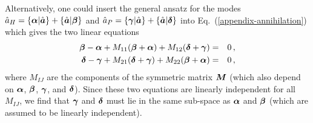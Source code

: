 \documentclass[aps,prd,showpacs,amssymb,nofootinbib,twocolumn]{revtex4}
\newcommand{\scalar}[2]{\left\{#1|#2\right\}}
\newcommand{\nn}{\nonumber\\}
\newcommand{\f}[1]{\mbox{\boldmath$#1$}}
\newcommand{\bea}{\begin{eqnarray}}
\newcommand{\ea}{\end{eqnarray}}
\begin{document}
Alternatively, one could insert the general ansatz for the modes 
$\hat a_H
=
\scalar{\f{\alpha}}{\hat{\f{a}}}+\scalar{\hat{\f{a}}}{\f{\beta}}$
and 
$\hat a_P
=
\scalar{\f{\gamma}}{\hat{\f{a}}}+\scalar{\hat{\f{a}}}{\f{\delta}}$
into Eq.~(\ref{appendix-annihilation}) which gives the two linear equations
%
\bea
\f{\beta}-\f{\alpha}+M_{11}(\f{\beta}+\f{\alpha})+M_{12}(\f{\delta}+\f{\gamma}) &=& 0 
\,,
\nn
\f{\delta}-\f{\gamma}+M_{21}(\f{\delta}+\f{\gamma})+M_{22}(\f{\beta}+\f{\alpha}) &=& 0 
\,,
\ea
%
where $M_{IJ}$ are the components of the symmetric matrix $\f{M}$ 
(which also depend on $\f{\alpha}$, $\f{\beta}$,  $\f{\gamma}$, and  $\f{\delta}$). 
%
Since these two equations are linearly independent for all $M_{IJ}$, we find that 
$\f{\gamma}$ and  $\f{\delta}$ must lie in the same sub-space as 
$\f{\alpha}$ and $\f{\beta}$ (which are assumed to be linearly independent). 
\end{document}
